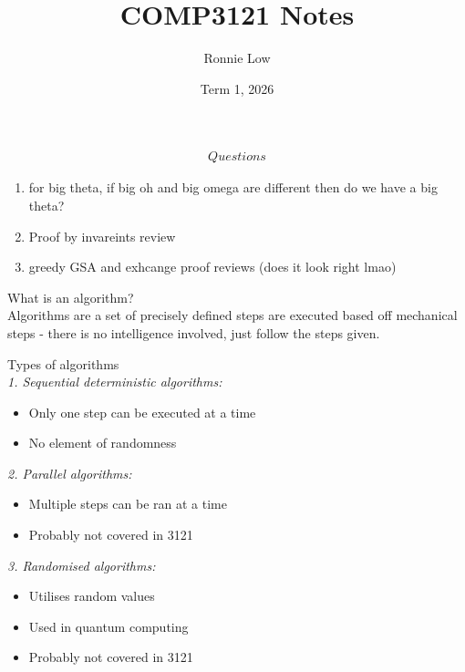 \documentclass[journal, letterpaper]{IEEEtran}
\title{COMP3121 Notes}
\author{Ronnie Low}
\date{Term 1, 2026}
\begin{document}
\maketitle


\begin{align}
    Questions
\end{align}

\begin{enumerate}
    \item for big theta, if big oh and big omega are different then do we have a big
        theta?
    \item Proof by invareints review
    \item greedy GSA and exhcange proof reviews (does it look right lmao)
\end{enumerate}

\begin{theory}{What is an algorithm?} \\
    Algorithms are a set of precisely defined steps are executed based off mechanical steps - there is no intelligence involved, just follow the steps given.
\end{theory}

\begin{aside}{Types of algorithms} \\
    \textit{1. Sequential deterministic algorithms:}
        \begin{itemize}
            \item Only one step can be executed at a time
            \item No element of randomness
        \end{itemize}
    \textit{2. Parallel algorithms:}
        \begin{itemize}
            \item Multiple steps can be ran at a time
            \item Probably not covered in 3121
        \end{itemize}
    \textit{3. Randomised algorithms:}
        \begin{itemize}
            \item Utilises random values
            \item Used in quantum computing
            \item Probably not covered in 3121
        \end{itemize}
\end{aside}
\end{document}

